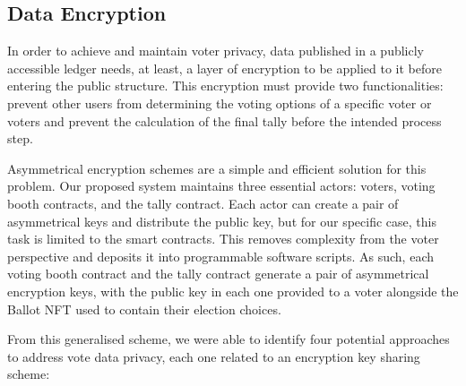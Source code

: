 \documentclass[../main.tex]{subfiles}
\begin{document}
\subsection{Data Encryption}
In order to achieve and maintain voter privacy, data published in a publicly accessible ledger needs, at least, a layer of encryption to be applied to it before entering the public structure. This encryption must provide two functionalities: prevent other users from determining the voting options of a specific voter or voters and prevent the calculation of the final tally before the intended process step.
\par
Asymmetrical encryption schemes are a simple and efficient solution for this problem. Our proposed system maintains three essential actors: voters, voting booth contracts, and the tally contract. Each actor can create a pair of asymmetrical keys and distribute the public key, but for our specific case, this task is limited to the smart contracts. This removes complexity from the voter perspective and deposits it into programmable software scripts. As such, each voting booth contract and the tally contract generate a pair of asymmetrical encryption keys, with the public key in each one provided to a voter alongside the Ballot NFT used to contain their election choices.
\par
From this generalised scheme, we were able to identify four potential approaches to address vote data privacy, each one related to an encryption key sharing scheme:
\end{document}
